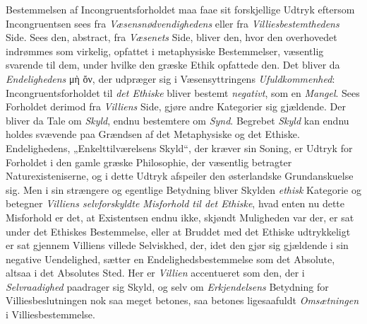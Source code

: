 Bestemmelsen af Incongruentsforholdet maa faae sit forskjellige Udtryk eftersom
Incongruentsen sees fra \emph{Væsensnødvendighedens} eller fra
\emph{Villiesbestemthedens} Side. Sees den, abstract, fra \emph{Væsenets} Side,
bliver den, hvor den overhovedet indrømmes som virkelig, opfattet i metaphysiske
Bestemmelser, væsentlig svarende til dem, under hvilke den græske Ethik opfattede
den. Det bliver da \emph{Endelighedens} μὴ ὄν, der udpræger sig i
Væsensyttringens \emph{Ufuldkommenhed}: Incongruentsforholdet til \emph{det
Ethiske} bliver bestemt \emph{negativt}, som en \emph{Mangel}. Sees Forholdet
derimod fra \emph{Villiens} Side, gjøre andre Kategorier sig gjældende. Der
bliver da Tale om \emph{Skyld}, endnu bestemtere om \emph{Synd}. Begrebet
\emph{Skyld} kan endnu holdes svævende paa Grændsen af det Metaphysiske og det
Ethiske. Endelighedens, „Enkelttilværelsens Skyld“, der kræver sin Soning, er
Udtryk for Forholdet i den gamle græske Philosophie, der væsentlig betragter
Naturexisteniserne, og i dette Udtryk afspeiler den østerlandske Grundanskuelse
sig. Men i sin strængere og egentlige Betydning bliver Skylden \emph{ethisk}
Kategorie og betegner \emph{Villiens selvforskyldte Misforhold til det Ethiske},
hvad enten nu dette Misforhold er det, at Existentsen endnu ikke, skjøndt
Muligheden var der, er sat under det Ethiskes Bestemmelse, eller at Bruddet med
det Ethiske udtrykkeligt er sat gjennem Villiens villede Selviskhed, der, idet
den gjør sig gjældende i sin negative Uendelighed, sætter en
Endelighedsbestemmelse som det Absolute, altsaa i det Absolutes Sted. Her er
\emph{Villien} accentueret som den, der i \emph{Selvraadighed} paadrager sig
Skyld, og selv om \emph{Erkjendelsens} Betydning for Villiesbeslutningen nok saa
meget betones, saa betones ligesaafuldt \emph{Omsætningen} i Villiesbestemmelse.

